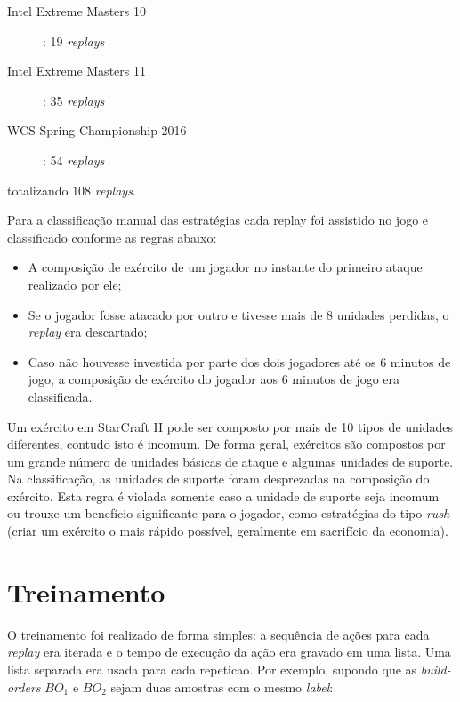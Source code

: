 \begin{description}
	\item[Intel Extreme Masters 10]: 19 \textit{\glspl{replay}}
	\item[Intel Extreme Masters 11]: 35 \textit{\glspl{replay}}
	\item[WCS Spring Championship 2016]: 54 \textit{\glspl{replay}}
\end{description}

\noindent totalizando $108$ \textit{\glspl{replay}}.

Para a classificação manual das estratégias cada \gls{replay} foi assistido no jogo e classificado conforme as regras abaixo:

\begin{itemize}
	\item A composição de exército de um jogador no instante do primeiro ataque realizado por ele;
	\item Se o jogador fosse atacado por outro e tivesse mais de 8 \glspl{unidade} perdidas, o \textit{\gls{replay}} era descartado;
	\item Caso não houvesse investida por parte dos dois jogadores até os 6 minutos de jogo, a composição de exército do jogador aos 6 minutos de jogo era classificada.
\end{itemize}

Um exército em StarCraft II pode ser composto por mais de 10 tipos de \glspl{unidade} diferentes, contudo isto é incomum. De forma geral, exércitos são compostos por um grande número de \glspl{unidade} básicas de ataque e algumas \glspl{unidade} de suporte. Na classificação, as \glspl{unidade} de suporte foram desprezadas na composição do exército. Esta regra é violada somente caso a \gls{unidade} de suporte seja incomum ou trouxe um benefício significante para o jogador, como estratégias do tipo \textit{rush} (criar um exército o mais rápido possível, geralmente em sacrifício da economia).

		\section{Treinamento}
		\label{sec:treinamento}

O treinamento foi realizado de forma simples: a sequência de ações para cada \textit{\gls{replay}} era iterada e o tempo de execução da ação era gravado em uma lista. Uma lista separada era usada para cada \gls{repeticao}. Por exemplo, supondo que as \textit{\glspl{build-order}} $BO_1$ e $BO_2$ sejam duas amostras com o mesmo \textit{label}:

